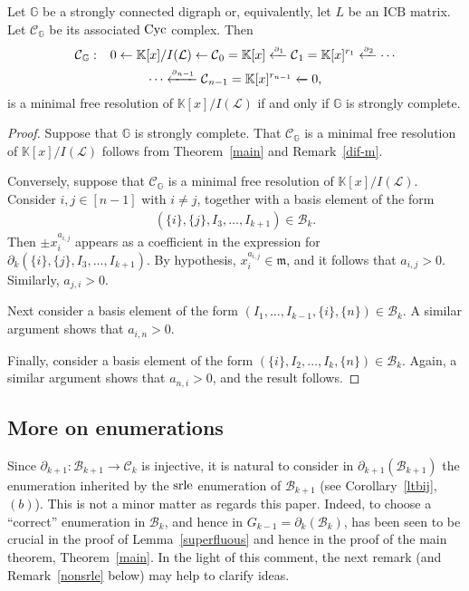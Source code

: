 \documentclass[ALCO]{cedram}
\newcommand{\mbk}{\mbox{$\mathbb{K}$}}
\newcommand{\mbg}{\mbox{$\mathbb{G}$}}
\newcommand{\mcb}{\mbox{$\mathcal{B}$}}
\newcommand{\mcc}{\mbox{$\mathcal{C}$}}
\newcommand{\mcl}{\mbox{$\mathcal{L}$}}
\newcommand{\icb}{\mbox{$\mathrm{ICB}$}}
\newcommand{\mfm}{\mbox{$\mathfrak{m}$}}
\newcommand{\dif}{\mbox{$\partial$}}
\newcommand{\sdif}{\mbox{\tiny $\partial$}}
\newcommand{\cyc}{\mbox{${\rm Cyc}$}}
\newcommand{\srle}{\mbox{${\rm srle}$}}
\begin{document}
\begin{corollary}\label{min-resolution}
Let $\mbg$ be a strongly connected digraph or, equivalently, let $L$
be an $\icb$ matrix. Let $\mcc_{\mathbb{G}}$ be its associated $\cyc$
complex. Then
\begin{multline*}
\mcc_{\mathbb{G}}:\phantom{+} 0\leftarrow \mbk[x]/I(\mcl)\leftarrow
\mcc_0=\mbk[x]\xleftarrow{\sdif_1} \mcc_1=\mbk[x]^{r_1}
\xleftarrow{\sdif_2} \cdots \\ \cdots 
\xleftarrow{\sdif_{n-1}}\mcc_{n-1}=\mbk[x]^{r_{n-1}}\xleftarrow{} 0,
\end{multline*}
is a minimal free resolution of $\mbk[x]/I(\mcl)$ if and only if
$\mbg$ is strongly complete.
\end{corollary}
\begin{proof}
Suppose that $\mbg$ is strongly complete. That $\mcc_{\mathbb{G}}$ is
a minimal free resolution of $\mbk[x]/I(\mcl)$ follows from
Theorem~\ref{main} and Remark~\ref{dif-m}.

Conversely, suppose that $\mcc_{\mathbb{G}}$ is a minimal free
resolution of $\mbk[x]/I(\mcl)$. Consider $i,j\in [n-1]$ with $i\neq
j$, together with a basis element of the form 
\begin{eqnarray*}
(\{i\},\{j\},I_3,\ldots ,I_{k+1})\in\mcb_k.
\end{eqnarray*}
Then $\pm x^{a_{i,j}}_i$ appears as a coefficient in the expression
for $\dif_k(\{i\},\{j\},I_3,\ldots ,I_{k+1})$. By hypothesis,
$x^{a_{i,j}}_i\in\mfm$, and it follows that $a_{i,j}>0$. Similarly,
$a_{j,i}>0$.

Next consider a basis element of the form $(I_1,\ldots
,I_{k-1},\{i\},\{n\})\in\mcb_k$. A similar argument shows that
$a_{i,n}>0$.

Finally, consider a basis element of the form $(\{i\},I_2,\ldots
,I_k,\{n\})\in\mcb_k$. Again, a similar argument shows that
$a_{n,i}>0$, and the result follows.
\end{proof}

\subsection{More on enumerations}

 Since $\dif_{k+1}:\mcb_{k+1}\to\mcc_{k}$ is injective, it is
natural to consider in $\dif_{k+1}(\mcb_{k+1})$ the enumeration
inherited by the $\srle$ enumeration of $\mcb_{k+1}$ (see
Corollary~\ref{ltbij}, $(b)$). This is not a minor matter as regards
this paper. Indeed, to choose a ``correct'' enumeration in $\mcb_{k}$,
and hence in $G_{k-1}=\dif_{k}(\mcb_{k})$, has been seen to be crucial
in the proof of Lemma~\ref{superfluous} and hence in the proof of the
main theorem, Theorem~\ref{main}. In the light of this comment, the
next remark (and Remark~\ref{nonsrle} below) may help to clarify
ideas.
\end{document}
